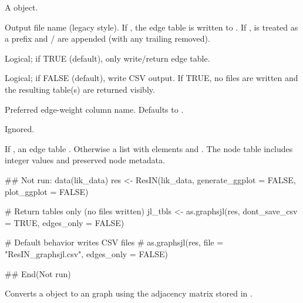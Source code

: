 \documentclass[a4paper]{book}
\begin{document}
\begin{Arguments}
\begin{ldescription}
\item[\code{x}] A  object.

\item[\code{file}] Output file name (legacy style). If ,
the edge table is written to . If ,
 is treated as a prefix and  /
 are appended (with any trailing  removed).

\item[\code{edges\_only}] Logical; if TRUE (default), only write/return edge table.

\item[\code{dont\_save\_csv}] Logical; if FALSE (default), write CSV output. If TRUE,
no files are written and the resulting table(s) are returned visibly.

\item[\code{weight\_col}] Preferred edge-weight column name. Defaults to .

\item[\code{...}] Ignored.
\end{ldescription}
\end{Arguments}
%
\begin{Value}
If , an edge table .
Otherwise a list with elements  and . The node table
includes integer  values and preserved node metadata.
\end{Value}
%
\begin{Examples}
\begin{ExampleCode}
## Not run: 
data(lik_data)
res <- ResIN(lik_data, generate_ggplot = FALSE, plot_ggplot = FALSE)

# Return tables only (no files written)
jl_tbls <- as.graphsjl(res, dont_save_csv = TRUE, edges_only = FALSE)

# Default behavior writes CSV files
# as.graphsjl(res, file = "ResIN_graphsjl.csv", edges_only = FALSE)

## End(Not run)

\end{ExampleCode}
\end{Examples}
%
\begin{Description}
Converts a  object to an  graph using the adjacency
matrix stored in .
\end{Description}
\end{document}
